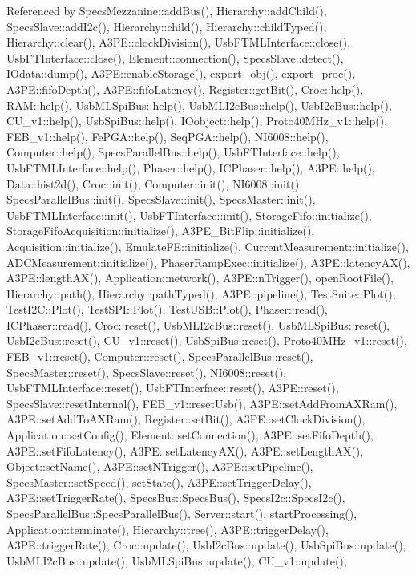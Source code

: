 Referenced by Specs\+Mezzanine\+::add\+Bus(), Hierarchy\+::add\+Child(), Specs\+Slave\+::add\+I2c(), Hierarchy\+::child(), Hierarchy\+::child\+Typed(), Hierarchy\+::clear(), A3\+P\+E\+::clock\+Division(), Usb\+F\+T\+M\+L\+Interface\+::close(), Usb\+F\+T\+Interface\+::close(), Element\+::connection(), Specs\+Slave\+::detect(), I\+Odata\+::dump(), A3\+P\+E\+::enable\+Storage(), export\+\_\+obj(), export\+\_\+proc(), A3\+P\+E\+::fifo\+Depth(), A3\+P\+E\+::fifo\+Latency(), Register\+::get\+Bit(), Croc\+::help(), R\+A\+M\+::help(), Usb\+M\+L\+Spi\+Bus\+::help(), Usb\+M\+L\+I2c\+Bus\+::help(), Usb\+I2c\+Bus\+::help(), C\+U\+\_\+v1\+::help(), Usb\+Spi\+Bus\+::help(), I\+Oobject\+::help(), Proto40\+M\+Hz\+\_\+v1\+::help(), F\+E\+B\+\_\+v1\+::help(), Fe\+P\+G\+A\+::help(), Seq\+P\+G\+A\+::help(), N\+I6008\+::help(), Computer\+::help(), Specs\+Parallel\+Bus\+::help(), Usb\+F\+T\+Interface\+::help(), Usb\+F\+T\+M\+L\+Interface\+::help(), Phaser\+::help(), I\+C\+Phaser\+::help(), A3\+P\+E\+::help(), Data\+::hist2d(), Croc\+::init(), Computer\+::init(), N\+I6008\+::init(), Specs\+Parallel\+Bus\+::init(), Specs\+Slave\+::init(), Specs\+Master\+::init(), Usb\+F\+T\+M\+L\+Interface\+::init(), Usb\+F\+T\+Interface\+::init(), Storage\+Fifo\+::initialize(), Storage\+Fifo\+Acquisition\+::initialize(), A3\+P\+E\+\_\+\+Bit\+Flip\+::initialize(), Acquisition\+::initialize(), Emulate\+F\+E\+::initialize(), Current\+Measurement\+::initialize(), A\+D\+C\+Measurement\+::initialize(), Phaser\+Ramp\+Exec\+::initialize(), A3\+P\+E\+::latency\+A\+X(), A3\+P\+E\+::length\+A\+X(), Application\+::network(), A3\+P\+E\+::n\+Trigger(), open\+Root\+File(), Hierarchy\+::path(), Hierarchy\+::path\+Typed(), A3\+P\+E\+::pipeline(), Test\+Suite\+::\+Plot(), Test\+I2\+C\+::\+Plot(), Test\+S\+P\+I\+::\+Plot(), Test\+U\+S\+B\+::\+Plot(), Phaser\+::read(), I\+C\+Phaser\+::read(), Croc\+::reset(), Usb\+M\+L\+I2c\+Bus\+::reset(), Usb\+M\+L\+Spi\+Bus\+::reset(), Usb\+I2c\+Bus\+::reset(), C\+U\+\_\+v1\+::reset(), Usb\+Spi\+Bus\+::reset(), Proto40\+M\+Hz\+\_\+v1\+::reset(), F\+E\+B\+\_\+v1\+::reset(), Computer\+::reset(), Specs\+Parallel\+Bus\+::reset(), Specs\+Master\+::reset(), Specs\+Slave\+::reset(), N\+I6008\+::reset(), Usb\+F\+T\+M\+L\+Interface\+::reset(), Usb\+F\+T\+Interface\+::reset(), A3\+P\+E\+::reset(), Specs\+Slave\+::reset\+Internal(), F\+E\+B\+\_\+v1\+::reset\+Usb(), A3\+P\+E\+::set\+Add\+From\+A\+X\+Ram(), A3\+P\+E\+::set\+Add\+To\+A\+X\+Ram(), Register\+::set\+Bit(), A3\+P\+E\+::set\+Clock\+Division(), Application\+::set\+Config(), Element\+::set\+Connection(), A3\+P\+E\+::set\+Fifo\+Depth(), A3\+P\+E\+::set\+Fifo\+Latency(), A3\+P\+E\+::set\+Latency\+A\+X(), A3\+P\+E\+::set\+Length\+A\+X(), Object\+::set\+Name(), A3\+P\+E\+::set\+N\+Trigger(), A3\+P\+E\+::set\+Pipeline(), Specs\+Master\+::set\+Speed(), set\+State(), A3\+P\+E\+::set\+Trigger\+Delay(), A3\+P\+E\+::set\+Trigger\+Rate(), Specs\+Bus\+::\+Specs\+Bus(), Specs\+I2c\+::\+Specs\+I2c(), Specs\+Parallel\+Bus\+::\+Specs\+Parallel\+Bus(), Server\+::start(), start\+Processing(), Application\+::terminate(), Hierarchy\+::tree(), A3\+P\+E\+::trigger\+Delay(), A3\+P\+E\+::trigger\+Rate(), Croc\+::update(), Usb\+I2c\+Bus\+::update(), Usb\+Spi\+Bus\+::update(), Usb\+M\+L\+I2c\+Bus\+::update(), Usb\+M\+L\+Spi\+Bus\+::update(), C\+U\+\_\+v1\+::update(), 